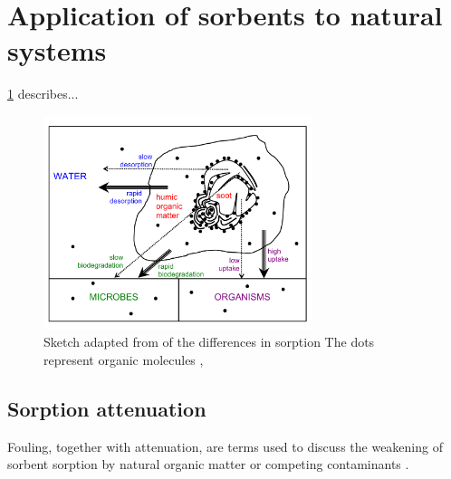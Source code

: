 \section{Application of sorbents to natural systems}

\cref{fig:cornelissen_sorption} describes...

\begin{figure}[htb]
    \centering
    \includegraphics[width=0.7\textwidth]{Diagrams/Cornelissen_sorption.pdf}
    \caption{Sketch adapted from \citep{Cornelissen2005} of the differences in sorption The dots represent organic molecules , }
    \label{fig:cornelissen_sorption}
\end{figure}

\subsection{Sorption attenuation}
Fouling, together with attenuation, are terms used to discuss the weakening of sorbent sorption by natural organic matter or competing contaminants \citep{Werner2006}.